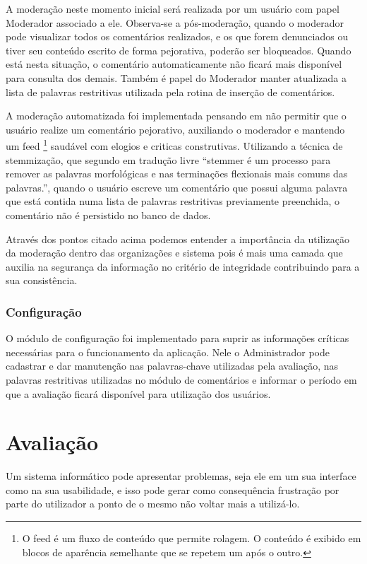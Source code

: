 \documentclass[12pt, a4paper]{report}
\begin{document}
A moderação neste momento inicial será realizada por um usuário com papel Moderador associado a ele. Observa-se a pós-moderação, quando o moderador pode visualizar todos os comentários realizados, e os que forem denunciados ou tiver seu conteúdo escrito de forma pejorativa, poderão ser bloqueados. Quando está nesta situação, o comentário automaticamente não ficará mais disponível para consulta dos demais. Também é papel do Moderador manter atualizada a lista de palavras restritivas utilizada pela rotina de inserção de comentários. 

A moderação automatizada foi implementada pensando em não permitir que o usuário realize um comentário pejorativo, auxiliando o moderador e mantendo um feed \footnote{O feed é um fluxo de conteúdo que permite rolagem. O conteúdo é exibido em blocos de aparência semelhante que se repetem um após o outro.}
saudável com elogios e criticas construtivas. Utilizando a técnica de stemmização, que segundo \cite{porter1980} em tradução livre “stemmer é um processo para remover as palavras morfológicas e nas terminações flexionais mais comuns das palavras.”, quando o usuário escreve um comentário que possui alguma palavra que está contida numa lista de palavras restritivas previamente preenchida, o comentário não é persistido no banco de dados.  

Através dos pontos citado acima podemos entender a importância da utilização da moderação dentro das organizações e sistema pois é  mais uma camada que auxilia na segurança da informação no critério de integridade contribuindo para a sua consistência.

\subsection{Configuração}
O módulo de configuração foi implementado para suprir as informações críticas necessárias para o funcionamento da aplicação. Nele o Administrador pode cadastrar e dar manutenção nas palavras-chave utilizadas pela avaliação, nas palavras restritivas utilizadas no módulo de comentários e informar o período em que a avaliação ficará disponível para utilização dos usuários.

\chapter{Avaliação}
\label{chap:avaliacao}

Um sistema informático pode apresentar problemas, seja ele em um sua interface como na sua usabilidade, e isso pode gerar como consequência frustração por parte do utilizador a ponto de o mesmo não voltar mais a utilizá-lo.
\end{document}

